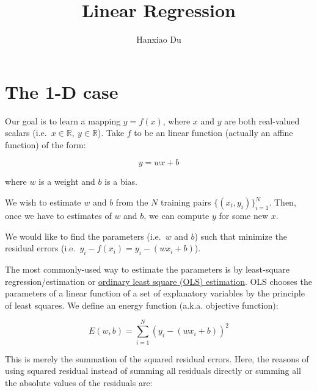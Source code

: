 \documentclass[12pt,a4paper]{article}
\title{Linear Regression}
\author{Hanxiao Du}
\date{}
\begin{document}
\maketitle
\tableofcontents



\section{The 1-D case}

Our goal is to learn a mapping \(y=f(x)\), where \(x\) and \(y\) are
both real-valued scalars (i.e.~\(x \in \mathbb{R},\ y\in \mathbb{R}\)).
Take \(f\) to be an linear function (actually an affine function) of the
form:

\begin{equation}y=wx+b\end{equation}

where \(w\) is a weight and \(b\) is a bias.

We wish to estimate \(w\) and \(b\) from the \(N\) training pairs
\(\{(x_i,y_i)\}^N_{i=1}\). Then, once we have to estimates of \(w\) and
\(b\), we can compute \(y\) for some new \(x\).

We would like to find the parameters (i.e.~\(w\) and \(b\)) such that
minimize the residual errors (i.e.~\(y_i-f(x_i) = y_i-(wx_i+b)\)).

The most commonly-used way to estimate the parameters is by least-square
regression/estimation or
\href{https://en.wikipedia.org/wiki/Ordinary_least_squares}{ordinary
least square (OLS) estimation}. OLS chooses the parameters of a linear
function of a set of explanatory variables by the principle of least
squares. We define an energy function (a.k.a. objective function):

\begin{equation}E(w,b)=\sum^N_{i=1} (y_i-(wx_i+b))^2\end{equation}

This is merely the summation of the squared residual errors. Here, the
reasons of using squared residual instead of summing all residuals
directly or summing all the absolute values of the residuals are:
\end{document}
